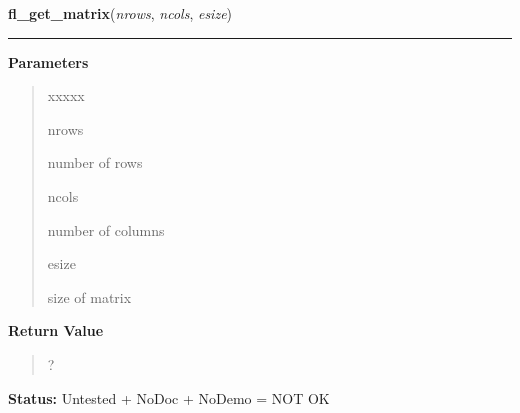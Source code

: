     \label{xformslib:library:fl_get_matrix}

    \vspace{0.5ex}

\hspace{.8\funcindent}\begin{boxedminipage}{\funcwidth}

    \raggedright \textbf{fl\_get\_matrix}(\textit{nrows}, \textit{ncols}, \textit{esize})

    \vspace{-1.5ex}

    \rule{\textwidth}{0.5\fboxrule}
\setlength{\parskip}{2ex}
\setlength{\parskip}{1ex}
      \textbf{Parameters}
      \vspace{-1ex}

      \begin{quote}
        \begin{Ventry}{xxxxx}

          \item[nrows]

          number of rows

          \item[ncols]

          number of columns

          \item[esize]

          size of matrix

        \end{Ventry}

      \end{quote}

      \textbf{Return Value}
    \vspace{-1ex}

      \begin{quote}
      ?

      \end{quote}

\textbf{Status:} Untested + NoDoc + NoDemo = NOT OK



    \end{boxedminipage}

    \label{xformslib:library:fl_make_matrix}

